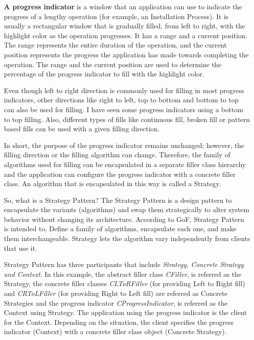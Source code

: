 \documentclass{book}
\begin{document}
\textbf{A progress indicator} is a window that an application can use to indicate the progress of a lengthy operation (for example, an Installation Process).
It is usually a rectangular window that is gradually filled, from left to right, with the highlight color as the operation progresses.
It has a range and a current position. The range represents the entire duration of the operation,
and the current position represents the progress the application has made towards completing the operation.
The range and the current position are used to determine the percentage of the progress indicator to fill with the highlight color.

Even though left to right direction is commonly used for filling in most progress indicators, other directions like right to left, top to bottom and bottom to top can also be used for filling.
I have seen some progress indicators using a bottom to top filling. Also, different types of fills like continuous fill, broken fill or pattern based fills can be used with a given filling direction.

In short, the purpose of the progress indicator remains unchanged; however, the filling direction or the filling algorithm can change.
Therefore, the family of algorithms used for filling can be encapsulated in a separate filler class hierarchy and the application can configure the progress indicator with a concrete filler class.
An algorithm that is encapsulated in this way is called a Strategy.

So, what is a Strategy Pattern? The Strategy Pattern is a design pattern to encapsulate the variants (algorithms) and swap them strategically to alter system behavior without changing its architecture.
According to GoF, Strategy Pattern is intended to, Define a family of algorithms, encapsulate each one, and make them interchangeable.
Strategy lets the algorithm vary independently from clients that use it.

Strategy Pattern has three participants that include \textit{Strategy, Concrete Strategy and Context}.
In this example, the abstract filler class \textit{CFiller}, is referred as the Strategy,
the concrete filler classes \textit{CLToRFiller} (for providing Left to Right fill) and \textit{CRToLFiller} (for providing Right to Left fill) are referred as Concrete Strategies and
the progress indicator \textit{CProgressIndicator}, is referred as the Context using Strategy.
The application using the progress indicator is the client for the Context.
Depending on the situation, the client specifies the progress indicator (Context) with a concrete filler class object (Concrete Strategy). 
\end{document}
